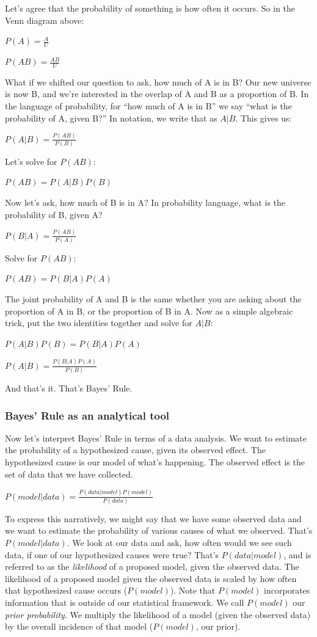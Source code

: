 \documentclass[
  letterpaper,
  DIV=11,
  numbers=noendperiod,
  oneside]{scrartcl}
\begin{document}
Let's agree that the probability of something is how often it occurs. So
in the Venn diagram above:

\(P(A)=\frac{A}{U}\)

\(P(AB)=\frac{AB}{U}\)

What if we shifted our question to ask, how much of A is in B? Our new
universe is now B, and we're interested in the overlap of A and B as a
proportion of B. In the language of probability, for ``how much of A is
in B'' we say ``what is the probability of A, given B?'' In notation, we
write that as \(A|B\). This gives us:

\(P(A|B)=\frac{P(AB)}{P(B)}\)

Let's solve for \(P(AB)\):

\(P(AB)=P(A|B)P(B)\)

Now let's ask, how much of B is in A? In probability language, what is
the probability of B, given A?

\(P(B|A)=\frac{P(AB)}{P(A)}\)

Solve for \(P(AB)\):

\(P(AB)=P(B|A)P(A)\)

The joint probability of A and B is the same whether you are asking
about the proportion of A in B, or the proportion of B in A. Now as a
simple algebraic trick, put the two identities together and solve for
\(A|B\):

\(P(A|B)P(B)=P(B|A)P(A)\)

\(P(A|B)=\frac{P(B|A)P(A)}{P(B)}\)

And that's it. That's Bayes' Rule.

\hypertarget{bayes-rule-as-an-analytical-tool}{%
\subsubsection{Bayes' Rule as an analytical
tool}\label{bayes-rule-as-an-analytical-tool}}

Now let's interpret Bayes' Rule in terms of a data analysis. We want to
estimate the probability of a hypothesized cause, given its observed
effect. The hypothesized cause is our model of what's happening. The
observed effect is the set of data that we have collected.

\(P(model|data)=\frac{P(data|model)P(model)}{P(data)}\)

To express this narratively, we might say that we have some observed
data and we want to estimate the probability of various causes of what
we observed. That's \(P(model|data)\). We look at our data and ask, how
often would we see such data, if one of our hypothesized causes were
true? That's \(P(data|model)\), and is referred to as the
\emph{likelihood} of a proposed model, given the observed data. The
likelihood of a proposed model given the observed data is scaled by how
often that hypothesized cause occurs (\(P(model)\)). Note that
\(P(model)\) incorporates information that is outside of our statistical
framework. We call \(P(model)\) our \emph{prior probability}. We
multiply the likelihood of a model (given the observed data) by the
overall incidence of that model (\(P(model)\), our prior).
\end{document}
